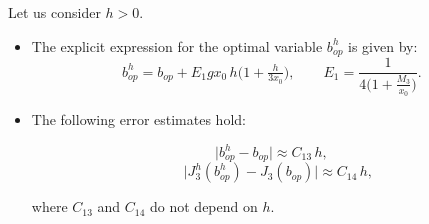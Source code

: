 \documentclass[axioms,article,submit,moreauthors]{Definitions/mdpi}
\begin{document}
\begin{Lemma} Let us consider $h > 0$.
    
     \begin{itemize}
      \item[(a)]  The explicit expression for the optimal variable ${b^h_{op}} $ is given by:     
     \begin{equation}\label{bhop}
      {b^h_{op}} =b_{op} + E_1 g x_0 \,h \Big(1+ \tfrac{h}{3 x_0}\Big), \qquad E_1 = \frac{1}{4 \Big(1+ \tfrac{M_3}{x_0} \Big)  }.
     \end{equation}
     
     \noindent 
     
      \item[(b)] The following error estimates hold:
  
     		\begin{equation}\label{bhop-bop}  
     				      \lvert {b^h_{op}} - b_{op} \rvert \approx C_{13} \, h ,
     				      \end{equation}\label{J3hbop-J3bop}
     				      \begin{equation}     		\quad 		     \Big \lvert  {J^h_{3}}({b^h_{op}}) -  J_3(b_{op}) \Big \rvert \approx C_{14} \, h,
     				      \end{equation}
    		
        where $C_{13}$  and $C_{14}$ do not depend on $h$.
     
     \end{itemize}
    
  \end{Lemma}
\end{document}
